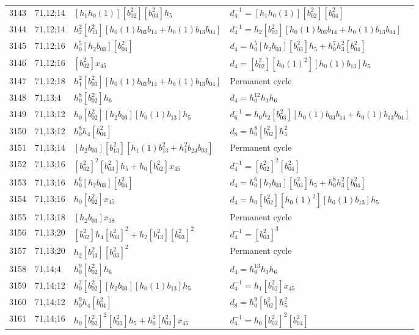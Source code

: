\documentclass{article}
\begin{document}
\begin{longtable}{|l|l|>{\raggedright\arraybackslash}p{6cm}|>{\raggedright\arraybackslash}p{6cm}|}
\hline
3143 & 71,12;14 & $[h_1h_0(1)][b_{02}^2][b_{03}^2]h_5$ & $d_{4}^{-1}=[h_1h_0(1)][b_{02}^2][b_{04}^2]$\\
3144 & 71,12;14 & $h_2^2[b_{13}^2][h_0(1)b_{03}b_{14} + h_0(1)b_{13}b_{04}]$ & $d_{4}^{-1}=h_2[b_{03}^2][h_0(1)b_{03}b_{14} + h_0(1)b_{13}b_{04}]$\\
\hline
3145 & 71,12;16 & $h_0^5[h_2b_{03}][b_{04}^2]$ &$d_{4}=h_0^5[h_2b_{03}][b_{03}^2]h_5 + h_0^7h_3^2[b_{04}^2]$\\
3146 & 71,12;16 & $[b_{02}^2]x_{45}$ &$d_{4}=[b_{02}^2][h_0(1)^2][h_0(1)b_{13}]h_5$\\
\hline
3147 & 71,12;18 & $h_1^2[b_{03}^2][h_0(1)b_{03}b_{14} + h_0(1)b_{13}b_{04}]$ & Permanent cycle\\
\hline
3148 & 71,13;4 & $h_0^8[b_{02}^2]h_6$ &$d_{4}=h_0^{12}h_3h_6$\\
\hline
3149 & 71,13;12 & $h_0[b_{02}^2][h_2b_{03}][h_0(1)b_{13}]h_5$ & $d_{6}^{-1}=h_0h_2[b_{03}^2][h_0(1)b_{03}b_{14} + h_0(1)b_{13}b_{04}]$\\
3150 & 71,13;12 & $h_0^8h_4[b_{04}^2]$ &$d_{8}=h_0^8[b_{02}^2]h_5^2$\\
\hline
3151 & 71,13;14 & $[h_2b_{03}][b_{13}^2][h_1(1)b_{13}^2 + h_1^2b_{24}b_{03}]$ & Permanent cycle\\
\hline
3152 & 71,13;16 & $[b_{02}^2]^2[b_{03}^2]h_5 + h_0[b_{02}^2]x_{45}$ & $d_{4}^{-1}=[b_{02}^2]^2[b_{04}^2]$\\
3153 & 71,13;16 & $h_0^6[h_2b_{03}][b_{04}^2]$ &$d_{4}=h_0^6[h_2b_{03}][b_{03}^2]h_5 + h_0^8h_3^2[b_{04}^2]$\\
3154 & 71,13;16 & $h_0[b_{02}^2]x_{45}$ &$d_{4}=h_0[b_{02}^2][h_0(1)^2][h_0(1)b_{13}]h_5$\\
\hline
3155 & 71,13;18 & $[h_2b_{03}]x_{38}$ & Permanent cycle\\
\hline
3156 & 71,13;20 & $[b_{02}^2]h_4[b_{03}^2]^2 + h_2[b_{13}^2][b_{03}^2]^2$ & $d_{4}^{-1}=[b_{03}^2]^3$\\
3157 & 71,13;20 & $h_2[b_{13}^2][b_{03}^2]^2$ & Permanent cycle\\
\hline
3158 & 71,14;4 & $h_0^9[b_{02}^2]h_6$ &$d_{4}=h_0^{13}h_3h_6$\\
\hline
3159 & 71,14;12 & $h_0^2[b_{02}^2][h_2b_{03}][h_0(1)b_{13}]h_5$ & $d_{4}^{-1}=h_1[b_{02}^2]x_{45}$\\
3160 & 71,14;12 & $h_0^9h_4[b_{04}^2]$ &$d_{8}=h_0^9[b_{02}^2]h_5^2$\\
\hline
3161 & 71,14;16 & $h_0[b_{02}^2]^2[b_{03}^2]h_5 + h_0^2[b_{02}^2]x_{45}$ & $d_{4}^{-1}=h_0[b_{02}^2]^2[b_{04}^2]$\\

\end{longtable}
\end{document}
